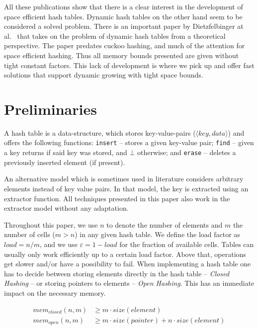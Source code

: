 \documentclass[a4paper,UKenglish]{lipics-v2016}
\begin{document}
All these publications show that there is a clear interest in the
development of space efficient hash tables.  Dynamic hash tables on the
other hand seem to be considered a solved problem.  There is an
important paper by Dietzfelbinger at
al.~\cite{DynamicPerfectHashingUpperAndLowerBounds} that takes on the
problem of dynamic hash tables from a theoretical perspective.  The
paper predates cuckoo hashing, and much of the attention for space
efficient hashing. Thus all memory bounds presented are given without
tight constant factors.  This lack of development is where we pick up
and offer fast solutions that support dynamic growing with tight space
bounds.

\section{Preliminaries}
A hash table is a data-structure, which stores key-value-pairs
($\langle key, data \rangle$) and offers the following functions:
\verb~insert~ -- stores a given key-value pair; \verb~find~ -- given a
key returns if said key was stored, and $\bot$ otherwise; and
\verb~erase~ -- deletes a previously inserted element (if present).

An alternative model which is sometimes used in literature considers
arbitrary elements instead of key value pairs.  In that model, the key
is extracted using an extractor function.  All techniques presented in
this paper also work in the extractor model without any adaptation.

Throughout this paper, we use $n$ to denote the number of elements and
$m$ the number of cells ($m > n$) in any given hash table.  We define
the load factor as $load = n/m$, and we use $\varepsilon = 1-load$ for
the fraction of available cells.  Tables can usually only work
efficiently up to a certain load factor.  Above that, operations get
slower and/or have a possibility to fail.  When implementing a hash
table one has to decide between storing elements directly in the hash
table -- \emph{Closed Hashing} -- or storing pointers to elements --
\emph{Open Hashing}. This has an immediate impact on the necessary
memory.

\begin{align*}
  mem_{closed}(n,m) &\geq m\cdot size(element)\\
  mem_{open}  (n,m) &\geq m\cdot size(pointer) + n\cdot size(element)\\
\end{align*}
\end{document}
